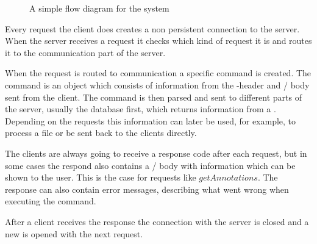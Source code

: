\begin{figure}[htb]
\caption{A simple flow diagram for the system}
\label{fig:com_systemoverview}
\end{figure}

Every request the client does creates a non persistent connection to
the server. When the server receives a request it checks which kind of
request it is and routes it to the communication part of the server.

When the request is routed to communication a specific command is
created. The command is an object which consists of information from
the -header and \json/ body sent from the
client. The command is then parsed and sent to different parts of the
server, usually the database first, which returns information from a
. Depending on the requests this information can later
be used, for example, to process a file or be sent back to the clients
directly.

The clients are always going to receive a response code after each
request, but in some cases the respond also contains a \json/
body with information which can be shown to the user. This is the case
for requests like $getAnnotations$. The response can also contain
error messages, describing what went wrong when executing the command.

After a client receives the response the connection with the server is
closed and a new is opened with the next request.
